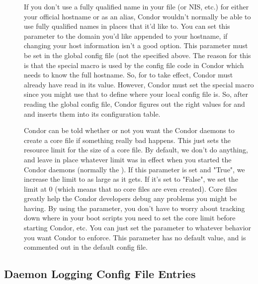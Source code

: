 \begin{description}
\item[] \label{param:DefaultDomainName}
  If you don't use a fully qualified name in your 
  file (or NIS, etc.) for either your official hostname or as an
  alias, Condor wouldn't normally be able to use fully qualified names
  in places that it'd like to.  You can set this parameter to the
  domain you'd like appended to your hostname, if changing your host
  information isn't a good option.  This parameter must be set in the
  global config file (not the  specified
  above.  The reason for this is that the 
  special macro is used by the config file code in Condor which needs
  to know the full hostname.  So, for  to
  take effect, Condor must already have read in its value.  However,
  Condor must set the  special macro since you
  might use that to define where your local config file is.  So, after
  reading the global config file, Condor figures out the right values
  for  and  and inserts them
  into its configuration table.

\item[] \label{param:CreateCoreFiles}
  Condor can be told whether or not you want the Condor daemons to
  create a core file if something really bad happens.  This just sets
  the resource limit for the size of a core file.  By default, we
  don't do anything, and leave in place whatever limit was in effect
  when you started the Condor daemons (normally the ).
  If this parameter is set and "True", we increase the limit to as
  large as it gets.  If it's set to "False", we set the limit at 0
  (which means that no core files are even created).  Core files
  greatly help the Condor developers debug any problems you might be
  having.  By using the parameter, you don't have to worry about
  tracking down where in your boot scripts you need to set the core
  limit before starting Condor, etc.  You can just set the parameter
  to whatever behavior you want Condor to enforce.  This parameter has
  no default value, and is commented out in the default config file. 

\end{description}


\subsection{\label{sec:Daemon-Logging-Config-File-Entries}
Daemon Logging Config File Entries}

